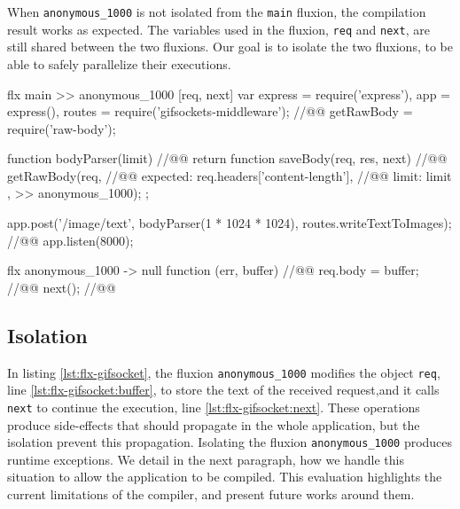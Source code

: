 
When \texttt{anonymous\-\_1000} is not isolated from the \texttt{main} fluxion, the compilation result works as expected.
The variables used in the fluxion, \texttt{req} and \texttt{next}, are still shared between the two fluxions.
Our goal is to isolate the two fluxions, to be able to safely parallelize their executions.

\begin{code}[flx, caption={Compilation result of gifsockets-server},label={lst:flx-gifsocket}]
flx main
>> anonymous_1000 [req, next]
  var express = require('express'),
      app = express(),
      routes = require('gifsockets-middleware'); //@\label{lst:flx-gifsocket:gif-mw}@
      getRawBody = require('raw-body');

  function bodyParser(limit) { //@\label{lst:flx-gifsocket:bodyParser}@
    return function saveBody(req, res, next) { //@\label{lst:flx-gifsocket:saveBody}@
      getRawBody(req, { //@\label{lst:flx-gifsocket:getRawBody}@
        expected: req.headers['content-length'], //@\label{lst:flx-gifsocket:req.headers}@
        limit: limit
      }, >> anonymous_1000);
    };
  }

  app.post('/image/text', bodyParser(1 * 1024 * 1024), routes.writeTextToImages); //@\label{lst:flx-gifsocket:app.post}@
  app.listen(8000);

flx anonymous_1000
-> null
  function (err, buffer) { //@\label{lst:flx-gifsocket:callback}@
    req.body = buffer; //@\label{lst:flx-gifsocket:buffer}@
    next(); //@\label{lst:flx-gifsocket:next}@
  }
\end{code}

\subsection{Isolation}

In listing \ref{lst:flx-gifsocket}, the fluxion \texttt{anonymous\_1000} modifies the object \texttt{req}, line \ref{lst:flx-gifsocket:buffer}, to store the text of the received request,and it calls \texttt{next} to continue the execution, line \ref{lst:flx-gifsocket:next}.
These operations produce side-effects that should propagate in the whole application, but the isolation prevent this propagation.
Isolating the fluxion \texttt{anonymous\_1000} produces runtime exceptions.
We detail in the next paragraph, how we handle this situation to allow the application to be compiled.
This evaluation highlights the current limitations of the compiler, and present future works around them.

